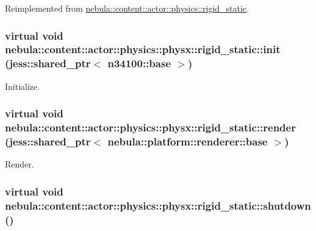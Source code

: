 Reimplemented from \hyperlink{classnebula_1_1content_1_1actor_1_1physics_1_1rigid__static_a0f4319c5cceb75e7d4376b82dba662de}{nebula::content::actor::physics::rigid\_\-static}.\hypertarget{classnebula_1_1content_1_1actor_1_1physics_1_1physx_1_1rigid__static_a4705b1b112a2acf67633658799d3f5fe}{
\subsubsection[{init}]{\setlength{\rightskip}{0pt plus 5cm}virtual void nebula::content::actor::physics::physx::rigid\_\-static::init (jess::shared\_\-ptr$<$ {\bf n34100::base} $>$)}}
\label{classnebula_1_1content_1_1actor_1_1physics_1_1physx_1_1rigid__static_a4705b1b112a2acf67633658799d3f5fe}


Initialize. \hypertarget{classnebula_1_1content_1_1actor_1_1physics_1_1physx_1_1rigid__static_adbbf849dd4601c92d5e292ae8158b769}{
\subsubsection[{render}]{\setlength{\rightskip}{0pt plus 5cm}virtual void nebula::content::actor::physics::physx::rigid\_\-static::render (jess::shared\_\-ptr$<$ {\bf nebula::platform::renderer::base} $>$)}}
\label{classnebula_1_1content_1_1actor_1_1physics_1_1physx_1_1rigid__static_adbbf849dd4601c92d5e292ae8158b769}


Render. \hypertarget{classnebula_1_1content_1_1actor_1_1physics_1_1physx_1_1rigid__static_ae7253d0ce8bbafb563677f786d68bb2e}{
\subsubsection[{shutdown}]{\setlength{\rightskip}{0pt plus 5cm}virtual void nebula::content::actor::physics::physx::rigid\_\-static::shutdown ()}}
\label{classnebula_1_1content_1_1actor_1_1physics_1_1physx_1_1rigid__static_ae7253d0ce8bbafb563677f786d68bb2e}


